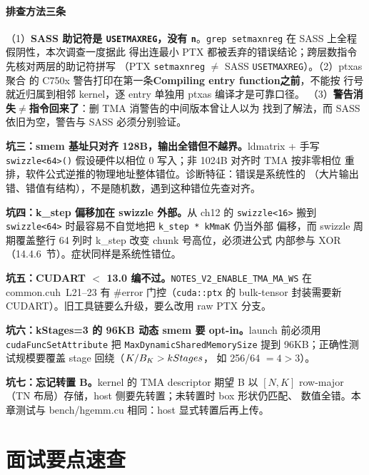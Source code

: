 \paragraph{排查方法三条} （1）\textbf{SASS 助记符是 \texttt{USETMAXREG}，没有
\texttt{n}}。\texttt{grep setmaxnreg} 在 SASS 上全程假阴性，本次调查一度据此
得出连最小 PTX 都被丢弃的错误结论；跨层数指令先核对两层的助记符拼写
（PTX \texttt{setmaxnreg} $\ne$ SASS \texttt{USETMAXREG}）。（2）ptxas 聚合
的 C750x 警告打印在第一条\textbf{Compiling entry function}\textbf{之前}，不能按
行号就近归属到相邻 kernel，逐 entry 单独用 ptxas 编译才是可靠口径。
（3）\textbf{警告消失}$\ne$\textbf{指令回来了}：删 TMA 消警告的中间版本曾让人以为
找到了解法，而 SASS 依旧为空，警告与 SASS 必须分别验证。

\textbf{坑三：smem 基址只对齐 128B，输出全错但不越界。}\allowbreak{}ldmatrix + 手写
\texttt{swizzle\allowbreak{}<64>\allowbreak{}()} 假设硬件以相位 0 写入；非 1024B 对齐时 TMA 按非零相位
重排，软件公式逆推的物理地址整体错位。诊断特征：错误是系统性的
（大片输出错、错值有结构），不是随机数，遇到这种错位先查对齐。

\textbf{坑四：k\_step 偏移加在 swizzle 外部。}从 ch12 的 \texttt{swizzle<16>}
搬到 \texttt{swizzle<64>} 时最容易不自觉地把 \texttt{k\_step * kMmaK} 仍当外部
偏移，而 swizzle 周期覆盖整行 64 列时 k\_step 改变 chunk 号高位，必须进公式
内部参与 XOR（14.4.6~节）。症状同样是系统性错位。

\textbf{坑五：CUDART $<$ 13.0 编不过。}\texttt{NOTES\_\allowbreak{}V2\_\allowbreak{}ENABLE\_\allowbreak{}TMA\_\allowbreak{}MA\_\allowbreak{}WS}
在 common.cuh~L21--23 有 \#error 门控（\texttt{cuda::ptx} 的 bulk-tensor
封装需要新 CUDART）。旧工具链要么升级，要么改用 raw PTX 分支。

\textbf{坑六：kStages=3 的 96KB 动态 smem 要 opt-in。}\allowbreak{}launch 前必须用
\texttt{cuda\allowbreak{}Func\allowbreak{}Set\allowbreak{}Attribute} 把 \texttt{Max\allowbreak{}Dynamic\allowbreak{}Shared\allowbreak{}Memory\allowbreak{}Size}
提到 96KB；正确性测试规模要覆盖 stage 回绕（$K/B\sb{K} > kStages$，
如 256/64 $= 4 > 3$）。

\textbf{坑七：忘记转置 B。}\allowbreak{}kernel 的 TMA descriptor 期望 B 以 $[N, K]$
row-major（TN 布局）存储，host 侧要先转置；未转置时 box 形状仍匹配、
数值全错。本章测试与 bench/hgemm.cu 相同：host 显式转置后再上传。

\section{面试要点速查}

